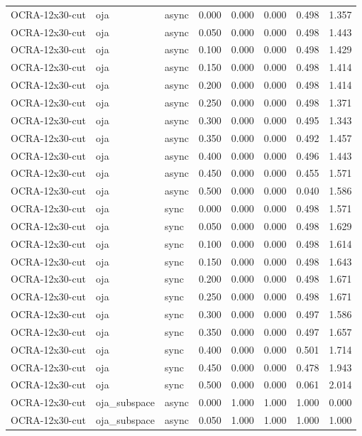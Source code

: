 \begin{tabular}{lllrrrrr}
OCRA-12x30-cut & oja & async & 0.000 & 0.000 & 0.000 & 0.498 & 1.357 \\
OCRA-12x30-cut & oja & async & 0.050 & 0.000 & 0.000 & 0.498 & 1.443 \\
OCRA-12x30-cut & oja & async & 0.100 & 0.000 & 0.000 & 0.498 & 1.429 \\
OCRA-12x30-cut & oja & async & 0.150 & 0.000 & 0.000 & 0.498 & 1.414 \\
OCRA-12x30-cut & oja & async & 0.200 & 0.000 & 0.000 & 0.498 & 1.414 \\
OCRA-12x30-cut & oja & async & 0.250 & 0.000 & 0.000 & 0.498 & 1.371 \\
OCRA-12x30-cut & oja & async & 0.300 & 0.000 & 0.000 & 0.495 & 1.343 \\
OCRA-12x30-cut & oja & async & 0.350 & 0.000 & 0.000 & 0.492 & 1.457 \\
OCRA-12x30-cut & oja & async & 0.400 & 0.000 & 0.000 & 0.496 & 1.443 \\
OCRA-12x30-cut & oja & async & 0.450 & 0.000 & 0.000 & 0.455 & 1.571 \\
OCRA-12x30-cut & oja & async & 0.500 & 0.000 & 0.000 & 0.040 & 1.586 \\
OCRA-12x30-cut & oja & sync & 0.000 & 0.000 & 0.000 & 0.498 & 1.571 \\
OCRA-12x30-cut & oja & sync & 0.050 & 0.000 & 0.000 & 0.498 & 1.629 \\
OCRA-12x30-cut & oja & sync & 0.100 & 0.000 & 0.000 & 0.498 & 1.614 \\
OCRA-12x30-cut & oja & sync & 0.150 & 0.000 & 0.000 & 0.498 & 1.643 \\
OCRA-12x30-cut & oja & sync & 0.200 & 0.000 & 0.000 & 0.498 & 1.671 \\
OCRA-12x30-cut & oja & sync & 0.250 & 0.000 & 0.000 & 0.498 & 1.671 \\
OCRA-12x30-cut & oja & sync & 0.300 & 0.000 & 0.000 & 0.497 & 1.586 \\
OCRA-12x30-cut & oja & sync & 0.350 & 0.000 & 0.000 & 0.497 & 1.657 \\
OCRA-12x30-cut & oja & sync & 0.400 & 0.000 & 0.000 & 0.501 & 1.714 \\
OCRA-12x30-cut & oja & sync & 0.450 & 0.000 & 0.000 & 0.478 & 1.943 \\
OCRA-12x30-cut & oja & sync & 0.500 & 0.000 & 0.000 & 0.061 & 2.014 \\
OCRA-12x30-cut & oja\_subspace & async & 0.000 & 1.000 & 1.000 & 1.000 & 0.000 \\
OCRA-12x30-cut & oja\_subspace & async & 0.050 & 1.000 & 1.000 & 1.000 & 1.000 \\

\end{tabular}
